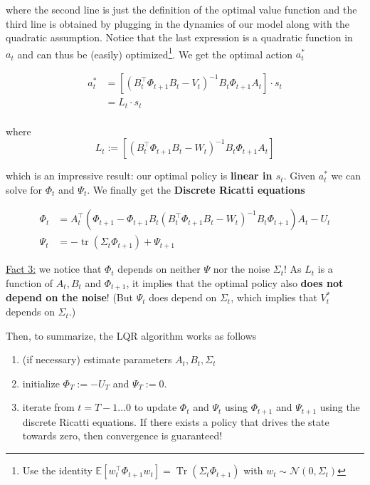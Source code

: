 \documentclass{article}
\begin{document}
\begin{enumerate}
	 where the second line is just the definition of the optimal value function and the third line is obtained by plugging in the dynamics of our model along with the quadratic assumption. Notice that the last expression is a quadratic function in $ a_t $ and can thus be (easily) optimized\footnote{Use the identity $ \mathbb{E}\left[ w_t^\top \Phi_{t+1} w_t \right] = \operatorname{Tr}(\Sigma_t \Phi_{t+1}) $ with $ w_t \sim \mathcal{N}\left(0, \Sigma_t \right) $}. We get the optimal action $ a_t^* $
	 
	 \begin{align*}
	 a_t^* &= \left[ (B_t^\top \Phi_{t+1} B_t - V_t)^{-1} B_t \Phi_{t+1} A_t \right] \cdot s_t\\
	  &= L_t \cdot s_t \\
	 \end{align*}
	 
	 where $$ L_t := \left[ (B_t^\top \Phi_{t+1} B_t - W_t)^{-1} B_t \Phi_{t+1} A_t \right] $$
	 
	  which is an impressive result: our optimal policy is \textbf{linear in $ s_t $}. Given $ a_t^* $ we can solve for $ \Phi_t $ and $ \Psi_t $. We finally get the \textbf{Discrete Ricatti equations}
	 
	 \begin{align*}
	 	\Phi_t &= A_t^\top \left( \Phi_{t+1} - \Phi_{t+1} B_t \left( B_t^\top \Phi_{t+1} B_t - W_t\right)^{-1} B_t \Phi_{t+1}\right) A_t - U_t \\
	 	\Psi_t &= - \operatorname{tr}\left(\Sigma_t \Phi_{t+1}\right) + \Psi_{t+1}
	 \end{align*}
	 
	 \underline{Fact 3:} we notice that $ \Phi_t $ depends on neither $ \Psi $ nor the noise $ \Sigma_t $!  As $ L_t $ is a function of $ A_t, B_t $ and $ \Phi_{t+1} $, it implies that the optimal policy also \textbf{does not depend on the noise}! (But $ \Psi_t $ does depend on $ \Sigma_t $, which implies that $ V_t^* $ depends on $ \Sigma_t $.)
	 
\end{enumerate}

Then, to summarize, the LQR algorithm works as follows

\begin{enumerate}
	\item (if necessary) estimate parameters $ A_t, B_t, \Sigma_t $
	\item initialize $ \Phi_T := - U_T $ and $ \Psi_T := 0 $.
	\item iterate from $ t=T-1 \dots 0 $ to update $ \Phi_t $ and $ \Psi_t $ using $ \Phi_{t+1} $ and $ \Psi_{t+1} $ using the discrete Ricatti equations. If there exists a policy that drives the state towards zero, then convergence is guaranteed!
\end{enumerate}
\end{document}
